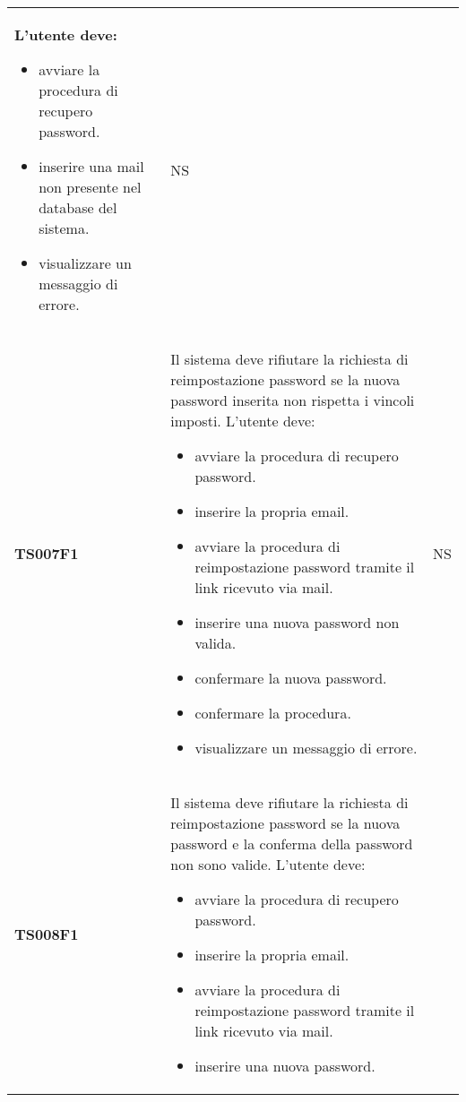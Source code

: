 \documentclass[../piano-di-qualifica.tex]{subfiles}
\begin{document}
\begin{centering}
\begin{longtable}[H]{>{\centering\bfseries}m{3cm} >{}p{10cm} >{\centering\arraybackslash}m{3cm}}
                        L'utente deve:
                        \begin{itemize}
                          \item avviare la procedura di recupero password.
                          \item inserire una mail non presente nel database del sistema.
                          \item visualizzare un messaggio di errore.
                        \end{itemize}
                      & NS \\
        TS007F1    & Il sistema deve rifiutare la richiesta di reimpostazione password se la nuova password inserita non rispetta i vincoli imposti. \newline
                      L'utente deve:
                      \begin{itemize}
                        \item avviare la procedura di recupero password.
                        \item inserire la propria email.
                        \item avviare la procedura di reimpostazione password tramite il link ricevuto via mail.
                        \item inserire una nuova password non valida.
                        \item confermare la nuova password.
                        \item confermare la procedura.
                        \item visualizzare un messaggio di errore.
                      \end{itemize}
                    & NS \\
        TS008F1    & Il sistema deve rifiutare la richiesta di reimpostazione password se la nuova password e la conferma della password non sono valide. \newline
                    L'utente deve:
                    \begin{itemize}
                      \item avviare la procedura di recupero password.
                      \item inserire la propria email.
                      \item avviare la procedura di reimpostazione password tramite il link ricevuto via mail.
                      \item inserire una nuova password.

\end{itemize}
\end{longtable}
\end{centering}
\end{document}
